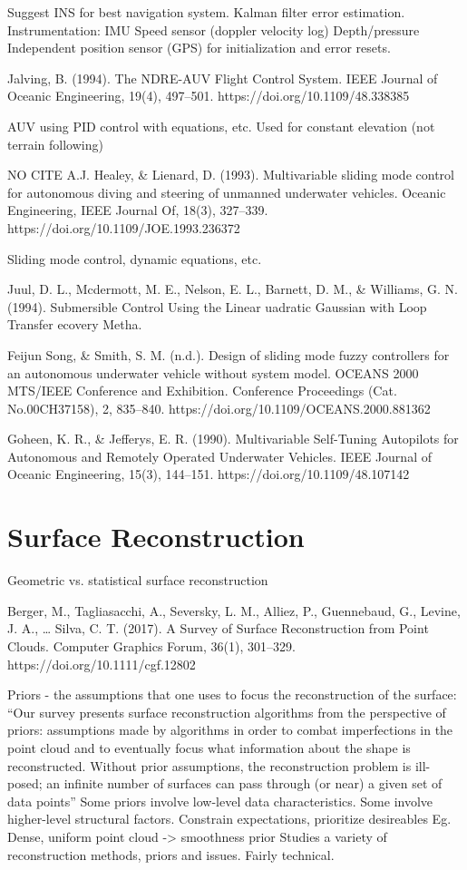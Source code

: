 \documentclass[10pt]{article}
\begin{document}
Suggest INS for best navigation system.
Kalman filter error estimation.
Instrumentation:
IMU
Speed sensor (doppler velocity log)
Depth/pressure
Independent position sensor (GPS) for initialization and error resets.

\cite{Jalving1994}
Jalving, B. (1994). The NDRE-AUV Flight Control System. IEEE Journal of Oceanic Engineering, 19(4), 497–501. https://doi.org/10.1109/48.338385

AUV using PID control with equations, etc.
Used for constant elevation (not terrain following)

NO CITE
A.J. Healey, \& Lienard, D. (1993). Multivariable sliding mode control for autonomous diving and steering of unmanned underwater vehicles. Oceanic Engineering, IEEE Journal Of, 18(3), 327–339. https://doi.org/10.1109/JOE.1993.236372

Sliding mode control, dynamic equations, etc.

\cite{Juul1994}
Juul, D. L., Mcdermott, M. E., Nelson, E. L., Barnett, D. M., \& Williams, G. N. (1994). Submersible Control Using the Linear uadratic Gaussian with Loop Transfer ecovery Metha.

\cite{FeijunSong}
Feijun Song, \& Smith, S. M. (n.d.). Design of sliding mode fuzzy controllers for an autonomous underwater vehicle without system model. OCEANS 2000 MTS/IEEE Conference and Exhibition. Conference Proceedings (Cat. No.00CH37158), 2, 835–840. https://doi.org/10.1109/OCEANS.2000.881362

\cite{Goheen1990}
Goheen, K. R., \& Jefferys, E. R. (1990). Multivariable Self-Tuning Autopilots for Autonomous and Remotely Operated Underwater Vehicles. IEEE Journal of Oceanic Engineering, 15(3), 144–151. https://doi.org/10.1109/48.107142

\section{Surface Reconstruction}

Geometric vs. statistical surface reconstruction

Berger, M., Tagliasacchi, A., Seversky, L. M., Alliez, P., Guennebaud, G., Levine, J. A., … Silva, C. T. (2017). A Survey of Surface Reconstruction from Point Clouds. Computer Graphics Forum, 36(1), 301–329. https://doi.org/10.1111/cgf.12802

Priors - the assumptions that one uses to focus the reconstruction of the surface:
“Our survey presents surface reconstruction algorithms from the perspective of priors: assumptions made by algorithms in order to combat imperfections in the point cloud and to eventually focus what information about the shape is reconstructed. Without prior assumptions, the reconstruction problem is ill-posed; an infinite number of surfaces can pass through (or near) a given set of data points”
Some priors involve low-level data characteristics. Some involve higher-level structural factors.
Constrain expectations, prioritize desireables
Eg. Dense, uniform point cloud -> smoothness prior
Studies a variety of reconstruction methods, priors and issues. 
Fairly technical.
\end{document}
